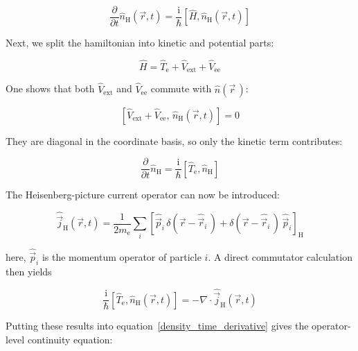 \begin{equation}
    \frac{\partial}{\partial t}\hat n_\mathrm{H}(\vec{r},t)
    = \frac{\mathrm{i}}{\hbar}\left[\hat{H},\hat n_\mathrm{H}(\vec{r},t)\right]
\label{density_time_derivative}
\end{equation}

Next, we split the hamiltonian into kinetic and potential parts:

\begin{equation}
    \hat{H} = \hat{T}_\mathrm{e} + \hat{V}_\mathrm{ext} + \hat{V}_\mathrm{ee}
\label{splitted_hamiltonian}
\end{equation}

One shows that both $\hat{V}_\mathrm{ext}$ and $\hat{V}_\mathrm{ee}$ commute with $\hat{n}(\vec{r}\,)$:

\begin{equation}
    \left[\hat{V}_\mathrm{ext}+\hat{V}_\mathrm{ee},\,\hat n_\mathrm{H}(\vec{r},t)\right] = 0
\label{commuting_potential_density}
\end{equation}

They are diagonal in the coordinate basis, so only the kinetic term contributes:

\begin{equation}
    \frac{\partial}{\partial t}\hat{n}_\mathrm{H}
    = \frac{\mathrm{i}}{\hbar}\left[\hat{T}_\mathrm{e},\hat{n}_\mathrm{H}\right]
\label{kinetic_term_contribution}
\end{equation}

The Heisenberg-picture current operator can now be introduced:

\begin{equation}
    \hat{\vec{j}}_\mathrm{H}(\vec{r},t)
    = \frac{1}{2m_\mathrm{e}}\sum_i\left[\hat{\vec{p}}_i\,\delta(\vec{r}-\hat{\vec{r}}_i\,)+\delta(\vec{r}-\hat{\vec{r}}_i\,)\,\hat{\vec{p}}_i\right]_\mathrm{H}
\label{heisenberg-picture_current_operator}
\end{equation}

here, $\hat{\vec{p}}_i$ is the momentum operator of particle $i$. A direct commutator calculation then yields

\begin{equation}
    \frac{\mathrm{i}}{\hbar}\left[\hat{T}_\mathrm{e},\hat n_\mathrm{H}(\vec{r},t)\right]
    = -\nabla\cdot\hat{\vec{j}}_\mathrm{H}(\vec{r},t)
\label{direct_commutator}
\end{equation}

Putting these results into equation~\eqref{density_time_derivative} gives the operator-level continuity equation:

